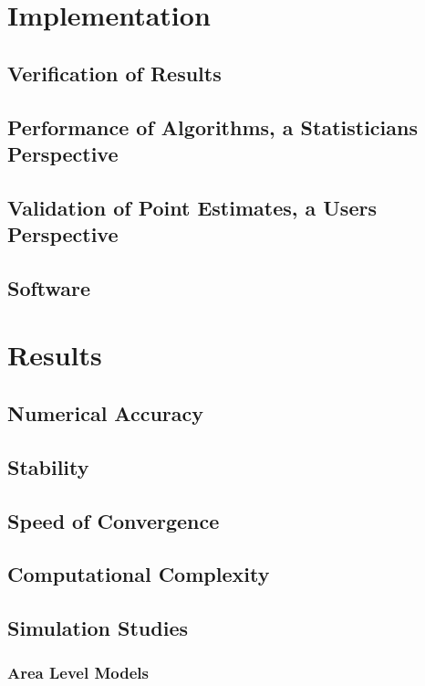 \part{Implementation}
\chapter{Verification of Results}
\chapter{Performance of Algorithms, a Statisticians Perspective}
\chapter{Validation of Point Estimates, a Users Perspective}
\chapter{Software}



\part{Results}
\chapter{Numerical Accuracy}
\chapter{Stability}
\chapter{Speed of Convergence}
\chapter{Computational Complexity}
\chapter{Simulation Studies}
\section{Area Level Models}
